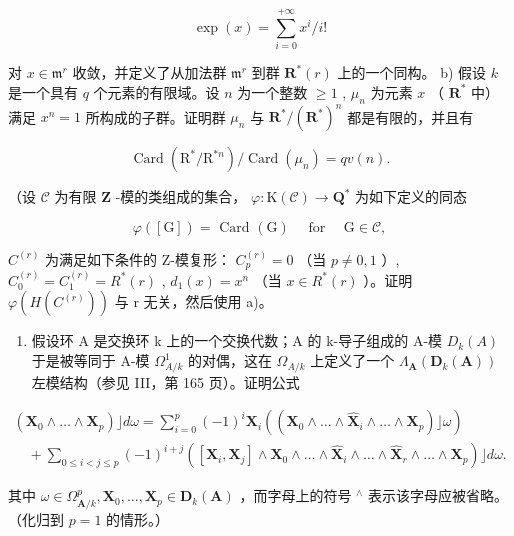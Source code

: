 \[
\exp (x) = \sum_ {i = 0} ^ {+ \infty} x ^ {i} / i!
\]

对 \(x \in \mathfrak{m}^r\) 收敛，并定义了从加法群 \(\mathfrak{m}^r\) 到群 \(\mathbf{R}^*(r)\) 上的一个同构。 b) 假设 \(k\) 是一个具有 \(q\) 个元素的有限域。设 \(n\) 为一个整数 \(\geqslant 1\) , \(\mu_n\) 为元素 \(x\) （ \(\mathbf{R}^*\) 中）满足 \(x^n = 1\) 所构成的子群。证明群 \(\mu_n\) 与 \(\mathbf{R}^*/(\mathbf{R}^*)^n\) 都是有限的，并且有

\[
\operatorname{Card} \left(\mathrm{R} ^ {*} / \mathrm{R} ^ {* n}\right) / \operatorname{Card} \left(\mu_ {n}\right) = q v (n).
\]

（设 \(\mathcal{C}\) 为有限 \(\mathbf{Z}\) -模的类组成的集合， \(\varphi : \mathrm{K}(\mathcal{C}) \to \mathbf{Q}^*\) 为如下定义的同态

\[
\varphi ([ \mathrm{G} ]) = \text { Card } (\mathrm{G}) \quad \text { for } \quad \mathrm{G} \in \mathscr {C},
\]

\(C^{(r)}\) 为满足如下条件的 Z-模复形： \(C_{p}^{(r)} = 0\) （当 \(p \neq 0, 1\) ）, \(C_{0}^{(r)} = C_{1}^{(r)} = R^{*}(r)\) , \(d_{1}(x) = x^{n}\) （当 \(x \in R^{*}(r)\) ）。证明 \(\varphi(H(C^{(r)}))\) 与 r 无关，然后使用 a)。

\begin{enumerate}
\def\labelenumi{\arabic{enumi})}
\setcounter{enumi}{20}
\tightlist
\item
  假设环 A 是交换环 k 上的一个交换代数；A 的 k-导子组成的 A-模 \(D_{k}(A)\) 于是被等同于 A-模 \(\Omega_{A/k}^{1}\) 的对偶，这在 \(\Omega_{A/k}\) 上定义了一个 \(\Lambda_{\mathbf{A}}(\mathbf{D}_{k}(\mathbf{A}))\) 左模结构（参见 III，第 165 页）。证明公式
\end{enumerate}

\[
\begin{array}{l} \left(\mathbf {X} _ {0} \wedge \dots \wedge \mathbf {X} _ {p}\right) \rfloor d \omega = \sum_ {i = 0} ^ {p} (- 1) ^ {i} \mathbf {X} _ {i} \left(\left(\mathbf {X} _ {0} \wedge \dots \wedge \hat {\mathbf {X}} _ {i} \wedge \dots \wedge \mathbf {X} _ {p}\right) \rfloor \omega\right) \\ \quad + \sum_ {0 \leqslant i <   j \leqslant p} (- 1) ^ {i + j} \left([ \mathbf {X} _ {i}, \mathbf {X} _ {j} ] \wedge \mathbf {X} _ {0} \wedge \dots \wedge \hat {\mathbf {X}} _ {i} \wedge \dots \wedge \hat {\mathbf {X}} _ {r} \wedge \dots \wedge \mathbf {X} _ {p}\right) \rfloor d \omega . \end{array}
\]

其中 \(\omega\in\Omega_{\mathbf{A}/k}^{p},\mathbf{X}_{0},\ldots,\mathbf{X}_{p}\in\mathbf{D}_{k}(\mathbf{A})\) ，而字母上的符号 \(^{\wedge}\) 表示该字母应被省略。（化归到 \(p=1\) 的情形。）


